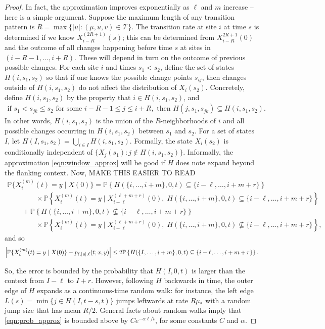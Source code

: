 \documentclass{article}
\renewcommand{\P}{\mathbb{P}}
\newcommand{\calT}{\mathcal{T}}  %
\newcommand{\st}{\colon}  %
\theoremstyle{plain}
\theoremstyle{definition}
\begin{document}
\begin{proof}

In fact, the approximation improves exponentially as $\ell$ and $m$ increase --
here is a simple argument.
Suppose the maximum length of any transition pattern is $R = \max\{ |u| : (\mu,u,v) \in \calT \}$.
The transition rate at site $i$ at time $s$ is determined if we know $X_{i-R}^{(2R+1)}(s)$;
this can be determined from $X_{i-R}^{2R+1}(0)$ and the outcome of all changes happening before time $s$ at sites in $(i-R-1, \ldots, i+R)$.
These will depend in turn on the outcome of previous possible changes.
For each site $i$ and times $s_1 < s_2$, define the set of states $H(i,s_1,s_2)$
so that if one knows the possible change points $s_{ij}$,
then changes outside of $H(i,s_1,s_2)$ do not affect the distribution of $X_i(s_2)$.
Concretely, define $H(i,s_1,s_2)$ by the property that $i \in H(i,s_1,s_2)$, and
\begin{gather}
  \text{if } s_1 < s_{jk} \le s_2 \text{ for some } i-R-1 \le j \le i+R, \text{ then } H(j,s_1,s_{jk}) \subseteq H(i,s_1,s_2) .
\end{gather}
In other words, $H(i,s_1,s_2)$ is the union of the $R$-neighborhoods of $i$ and all possible changes occurring in $H(i,s_1,s_2)$ between $s_1$ and $s_2$.
For a set of states $I$, let $H(I,s_1,s_2) = \bigcup_{i\in I} H(i,s_1,s_2)$.
Formally, the state $X_i(s_2)$ is conditionally independent of $\{X_j(s_1) \st j \notin H(i,s_1,s_2)\}$.
Informally, the approximation \eqref{eqn:window_approx} will be good if $H$ does note expand beyond the flanking context.
Now, MAKE THIS EASIER TO READ
\begin{multline}
  \P\{ X_i^{(m)}(t) = y \mid X(0) \}
  = \P\left\{ H(\{i,\ldots,i+m\},0,t)\subseteq\{i-\ell,\ldots,i+m+r\} \right\} \\
   \qquad \qquad {} \times \P\left\{ X_i^{(m)}(t) = y \mid X_{i-\ell}^{(\ell+m+r)}(0), \; H(\{i,\ldots,i+m\},0,t)\subseteq\{i-\ell,\ldots,i+m+r\} \right\} \\
     \qquad {} + \P\left\{ H(\{i,\ldots,i+m\},0,t)\nsubseteq\{i-\ell,\ldots,i+m+r\} \right\}  \\
   \qquad\qquad {} \times \P\left\{ X_i^{(m)}(t) = y \mid X_{i-\ell}^{(\ell+m+r)}(0), \; H(\{i,\ldots,i+m\},0,t)\nsubseteq\{i-\ell,\ldots,i+m+r\} \right\} ,
\end{multline}
and so
\begin{align} \label{eqn:prob_approx}
  \left| \P\{ X_i^{(m)}(t) = y \mid X(0) \} - p_{\lyl}(t;x,y) \right| \le 2 \P\left\{  H(\{I,\ldots,i+m\},0,t)\subseteq\{i-\ell,\ldots,i+m+r\} \right\}.
\end{align}

So, the error is bounded by the probability that $H(I,0,t)$ is larger than the context from $I-\ell$ to $I+r$.
However, following $H$ backwards in time, the outer edge of $H$ expands as a continuous-time random walk:
for instance, the left edge $L(s) = \min \{ j \in H(I,t-s,t) \}$ jumps leftwards at rate $R\mu_*$ with a random jump size
that has mean $R/2$.
General facts about random walks imply that \eqref{eqn:prob_approx} is bounded above by $C e^{-\alpha \ell/t}$, for some constants $C$ and $\alpha$.

\end{proof}
\end{document}
